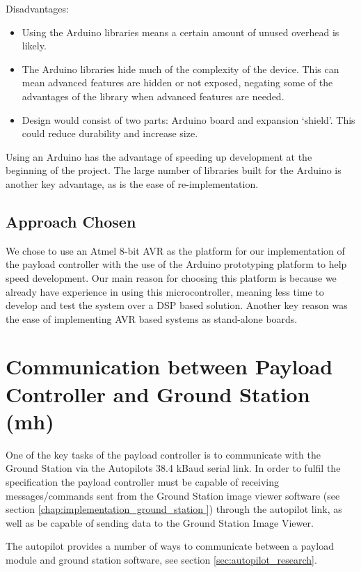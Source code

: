 Disadvantages:
\begin{itemize}
\item Using the Arduino libraries means a certain amount of unused overhead is likely.

\item The Arduino libraries hide much of the complexity of the device. This can mean advanced features are hidden or not exposed, negating some of the advantages of the library when advanced features are needed.

\item Design would consist of two parts: Arduino board and expansion `shield'. This could reduce durability and increase size.
\end{itemize}

Using an Arduino has the advantage of speeding up development at the beginning of the project. The large number of libraries built for the Arduino is another key advantage, as is the ease of re-implementation.

\subsection{Approach Chosen}
We chose to use an Atmel 8-bit AVR as the platform for our implementation of the payload controller with the use of the Arduino prototyping platform to help speed development. Our main reason for choosing this platform is because we already have experience in using this microcontroller, meaning less time to develop and 
test the system over a DSP based solution. Another key reason was the ease of implementing AVR based systems as 
stand-alone boards.

\section{Communication between Payload Controller and Ground Station (mh)}
One of the key tasks of the payload controller is to communicate with the Ground Station via the Autopilots 38.4 kBaud serial link. In order to fulfil the specification the payload controller must be capable of receiving messages/commands sent from the Ground Station image viewer software (see section \ref{chap:implementation_ground_station }) through the autopilot link, as well as be capable of sending data to the Ground Station Image Viewer.

The autopilot provides a number of ways to communicate between a payload module and ground station software, see section \ref{sec:autopilot_research}.


